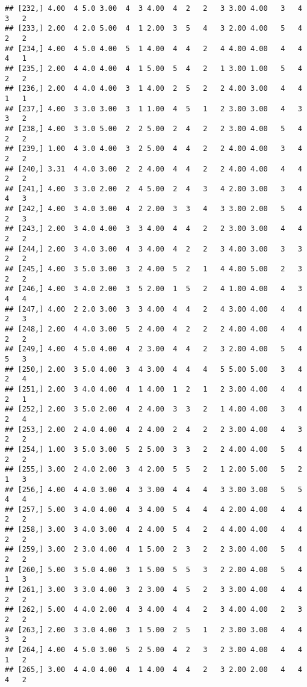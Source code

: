 \documentclass[]{article}
\begin{document}
\begin{verbatim}
## [232,] 4.00  4 5.0 3.00  4  3 4.00  4  2   2   3 3.00 4.00   3   4   3   2
## [233,] 2.00  4 2.0 5.00  4  1 2.00  3  5   4   3 2.00 4.00   5   4   2   2
## [234,] 4.00  4 5.0 4.00  5  1 4.00  4  4   2   4 4.00 4.00   4   4   4   1
## [235,] 2.00  4 4.0 4.00  4  1 5.00  5  4   2   1 3.00 1.00   5   4   2   2
## [236,] 2.00  4 4.0 4.00  3  1 4.00  2  5   2   2 4.00 3.00   4   4   1   1
## [237,] 4.00  3 3.0 3.00  3  1 1.00  4  5   1   2 3.00 3.00   4   3   3   2
## [238,] 4.00  3 3.0 5.00  2  2 5.00  2  4   2   2 3.00 4.00   5   4   2   2
## [239,] 1.00  4 3.0 4.00  3  2 5.00  4  4   2   2 4.00 4.00   3   4   2   2
## [240,] 3.31  4 4.0 3.00  2  2 4.00  4  4   2   2 4.00 4.00   4   4   2   2
## [241,] 4.00  3 3.0 2.00  2  4 5.00  2  4   3   4 2.00 3.00   3   4   4   3
## [242,] 4.00  3 4.0 3.00  4  2 2.00  3  3   4   3 3.00 2.00   5   4   2   3
## [243,] 2.00  3 4.0 4.00  3  3 4.00  4  4   2   2 3.00 3.00   4   4   2   2
## [244,] 2.00  3 4.0 3.00  4  3 4.00  4  2   2   3 4.00 3.00   3   3   2   2
## [245,] 4.00  3 5.0 3.00  3  2 4.00  5  2   1   4 4.00 5.00   2   3   2   2
## [246,] 4.00  3 4.0 2.00  3  5 2.00  1  5   2   4 1.00 4.00   4   3   4   4
## [247,] 4.00  2 2.0 3.00  3  3 4.00  4  4   2   4 3.00 4.00   4   4   2   3
## [248,] 2.00  4 4.0 3.00  5  2 4.00  4  2   2   2 4.00 4.00   4   4   2   2
## [249,] 4.00  4 5.0 4.00  4  2 3.00  4  4   2   3 2.00 4.00   5   4   5   3
## [250,] 2.00  3 5.0 4.00  3  4 3.00  4  4   4   5 5.00 5.00   3   4   2   4
## [251,] 2.00  3 4.0 4.00  4  1 4.00  1  2   1   2 3.00 4.00   4   4   2   1
## [252,] 2.00  3 5.0 2.00  4  2 4.00  3  3   2   1 4.00 4.00   3   4   2   4
## [253,] 2.00  2 4.0 4.00  4  2 4.00  2  4   2   2 3.00 4.00   4   3   2   2
## [254,] 1.00  3 5.0 3.00  5  2 5.00  3  3   2   2 4.00 4.00   5   4   2   2
## [255,] 3.00  2 4.0 2.00  3  4 2.00  5  5   2   1 2.00 5.00   5   2   1   3
## [256,] 4.00  4 4.0 3.00  4  3 3.00  4  4   4   3 3.00 3.00   5   5   4   4
## [257,] 5.00  3 4.0 4.00  4  3 4.00  5  4   4   4 2.00 4.00   4   4   2   2
## [258,] 3.00  3 4.0 3.00  4  2 4.00  5  4   2   4 4.00 4.00   4   4   2   2
## [259,] 3.00  2 3.0 4.00  4  1 5.00  2  3   2   2 3.00 4.00   5   4   2   2
## [260,] 5.00  3 5.0 4.00  3  1 5.00  5  5   3   2 2.00 4.00   5   4   1   3
## [261,] 3.00  3 3.0 4.00  3  2 3.00  4  5   2   3 3.00 4.00   4   4   2   2
## [262,] 5.00  4 4.0 2.00  4  3 4.00  4  4   2   3 4.00 4.00   2   3   2   2
## [263,] 2.00  3 3.0 4.00  3  1 5.00  2  5   1   2 3.00 3.00   4   4   3   2
## [264,] 4.00  4 5.0 3.00  5  2 5.00  4  2   3   2 3.00 4.00   4   4   1   2
## [265,] 3.00  4 4.0 4.00  4  1 4.00  4  4   2   3 2.00 2.00   4   4   4   2

\end{verbatim}
\end{document}
